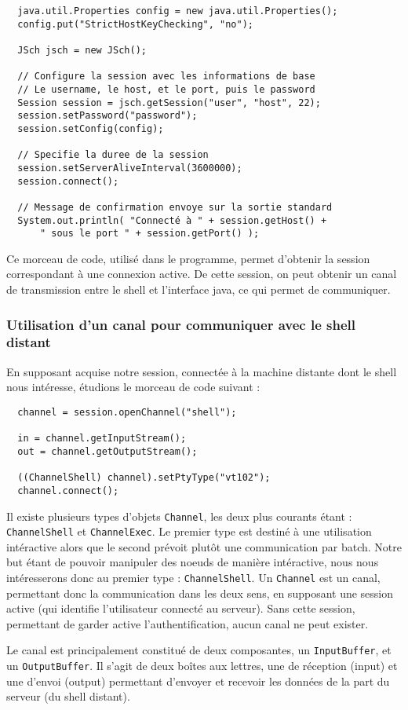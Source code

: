 \begin{verbatim}
  java.util.Properties config = new java.util.Properties(); 
  config.put("StrictHostKeyChecking", "no");
  
  JSch jsch = new JSch();

  // Configure la session avec les informations de base
  // Le username, le host, et le port, puis le password
  Session session = jsch.getSession("user", "host", 22);
  session.setPassword("password");
  session.setConfig(config);

  // Specifie la duree de la session
  session.setServerAliveInterval(3600000);
  session.connect();

  // Message de confirmation envoye sur la sortie standard
  System.out.println( "Connecté à " + session.getHost() + 
      " sous le port " + session.getPort() );
\end{verbatim}

\par Ce morceau de code, utilisé dans le programme, permet d'obtenir la session correspondant à une connexion active. De cette session, on peut obtenir un canal de transmission entre le shell et l'interface java, ce qui permet de communiquer.

\subsubsection{Utilisation d'un canal pour communiquer avec le shell distant}
\label{sec:util-dun-canal}

\par En supposant acquise notre session, connectée à la machine distante dont le shell nous intéresse, étudions le morceau de code suivant :

\begin{verbatim}
  channel = session.openChannel("shell");
  
  in = channel.getInputStream();
  out = channel.getOutputStream();
  
  ((ChannelShell) channel).setPtyType("vt102");
  channel.connect();
\end{verbatim}

\par Il existe plusieurs types d'objets \texttt{Channel}, les deux plus courants étant : \texttt{ChannelShell} et \texttt{ChannelExec}. Le premier type est destiné à une utilisation intéractive alors que le second prévoit plutôt une communication par batch. Notre but étant de pouvoir manipuler des noeuds de manière intéractive, nous nous intéresserons donc au premier type : \texttt{ChannelShell}. Un \texttt{Channel} est un canal, permettant donc la communication dans les deux sens, en supposant une session active (qui identifie l'utilisateur connecté au serveur). Sans cette session, permettant de garder active l'authentification, aucun canal ne peut exister.
\par Le canal est principalement constitué de deux composantes, un \texttt{InputBuffer}, et un \texttt{OutputBuffer}. Il s'agit de deux boîtes aux lettres, une de réception (input) et une d'envoi (output) permettant d'envoyer et recevoir les données de la part du serveur (du shell distant). 

